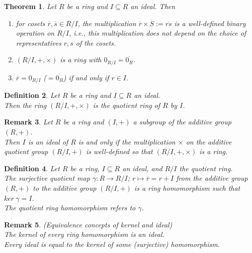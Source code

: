 \documentclass[a4paper,8pt]{article}
\theoremstyle{theorem}
\newtheorem{theorem}{Theorem}[subsection]
\newtheorem{definition}[theorem]{Definition}
\newtheorem{remark}[theorem]{Remark}
\begin{document}
\begin{theorem}
Let $R$ be a ring and $I \subseteq R$ an ideal. Then
\begin{enumerate}[label=(\roman*)]
\item for cosets $\overline{r}, \overline{s} \in R/I$, the multiplication $\overline{r} \times \overline{S} := \overline{rs}$ is a well-defined binary operation on $R/I$, i.e., this multiplication does not depend on the choice of representatives $r, s$ of the cosets.
\item $(R/I, +, \times)$ is a ring with $0_{R/I} = \overline{0_R}$.
\item $\overline{r} = 0_{R/I}$ ($=\overline{0_R}$) if and only if $r \in I$.
\end{enumerate}
\end{theorem}


\begin{definition}
Let $R$ be a ring and $I \subseteq R$ an ideal.\\
Then the ring $(R/I, +, \times)$ is the \textit{{\color{blue} quotient ring}} of $R$ by $I$.\\
\end{definition}


\begin{remark}
Let $R$ be a ring and $(I, +)$ a subgroup of the additive group $(R, +)$.\\
Then $I$ is an ideal of $R$ is and only if the multiplication $\times$ on the additive quotient group $(R/I, +)$ is well-defined so that $(R/I, +, \times)$ is a ring.\\	
\end{remark}


\begin{definition}
Let $R$ be a ring, $I \subseteq R$ an ideal, and $R/I$ the quotient ring.\\
The \textit{{\color{blue} surjective quotient map}} $\gamma: R \rightarrow R/I$; $r \mapsto \overline{r} = r + I$ from the additive group $(R, +)$ to the additive group $(R/I, +)$ is a ring homomorphism such that $ker \ \gamma = I$.\\
The \textit{{\color{blue} quotient ring homomorphism}} refers to $\gamma$.\\
\end{definition}


\begin{remark}
\textit{{\color{blue} (Equivalence concepts of kernel and ideal)}}\\
The kernel of every ring homomorphism is an ideal.\\
Every ideal is equal to the kernel of some (surjective) homomorphism.\\
\end{remark}
\end{document}
